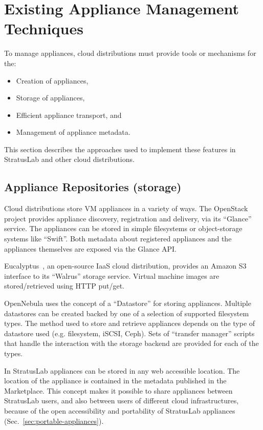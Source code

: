 \section{Existing Appliance Management Techniques}
\label{sec:other-approaches}

To manage appliances, cloud distributions must provide tools or
mechanisms for the:
\begin{itemize}
\item Creation of appliances,
\item Storage of appliances,
\item Efficient appliance transport, and
\item Management of appliance metadata.
\end{itemize}
This section describes the approaches used to implement these features
in StratusLab and other cloud distributions.

\subsection{Appliance Repositories (storage)}

Cloud distributions store VM appliances in a variety of ways. 
The OpenStack project provides appliance discovery, registration and delivery, 
via its ``Glance'' service. The appliances can be stored in simple filesystems or 
object-storage systems like ``Swift''\@. Both metadata about registered appliances 
and the appliances themselves are exposed via the Glance API\@.

Eucalyptus~\cite{eucalyptus}, an open-source IaaS cloud distribution, provides an Amazon S3 interface to its 
``Walrus'' storage service. Virtual machine images are stored/retrieved using HTTP put/get.

OpenNebula uses the concept of a ``Datastore'' for storing appliances. 
Multiple datastores can be created backed by one of a selection of supported filesystem types. 
The method used to store and retrieve appliances depends on the type of datastore used (e.g. filesystem, 
iSCSI, Ceph). Sets of ``transfer manager'' scripts that handle the interaction with the storage backend are provided for 
each of the types.

In StratusLab appliances can be stored in any web accessible location. The location of the appliance 
is contained in the metadata published in the Marketplace\@. This concept makes it possible 
to share appliances between StratusLab users, and also between users of different cloud 
infrastructures, because of the open accessibility and portability of StratusLab appliances (Sec.~\ref{sec:portable-appliances}). 

